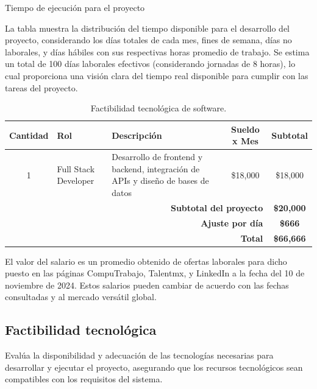 \caption{Tiempo de ejecución para el proyecto} \label{tabla:tiempo_proyecto}
\vspace{0.5cm}
\endgroup
La tabla muestra la distribución del tiempo disponible para el desarrollo del proyecto, considerando los días totales de cada mes, fines de semana, días no laborales, y días hábiles con sus respectivas horas promedio de trabajo. Se estima un total de 100 días laborales efectivos (considerando jornadas de 8 horas), lo cual proporciona una visión clara del tiempo real disponible para cumplir con las tareas del proyecto.

\begin{table}[H]
	\centering
	\begin{tabular}{|c|>{\centering\arraybackslash}m{2.5cm}|>{\centering\arraybackslash}m{3cm}|c|c|}
		\hline
		\rowcolor{black!75} \color{white} \textbf{Cantidad} & \color{white} \textbf{Rol} & \color{white} \textbf{Descripción} & \color{white} \textbf{Sueldo x Mes} & \color{white} \textbf{Subtotal} \\ 
		\hline
		1 & Full Stack Developer & Desarrollo de frontend y backend, integración de APIs y diseño de bases de datos & \$18,000 & \$18,000 \\ 
		\hline
		\multicolumn{4}{r|}{\textbf{Subtotal del proyecto}} & \textbf{\$20,000} \\ 
		\hline
		\multicolumn{4}{r|}{\textbf{Ajuste por día}} & \textbf{\$666} \\ 
		\hline
		\multicolumn{4}{r|}{\textbf{Total}} & \textbf{\$66,666} \\ 
		\hline
	\end{tabular}
	\caption{Factibilidad tecnológica de software.}
	\label{tab:costos_roles}
\end{table}



El valor del salario es un promedio obtenido de ofertas laborales para dicho puesto en las páginas CompuTrabajo, Talentmx, y LinkedIn a la fecha del 10 de noviembre de 2024. Estos salarios pueden cambiar de acuerdo con las fechas consultadas y al mercado versátil global.

\subsection{Factibilidad tecnológica}

Evalúa la disponibilidad y adecuación de las tecnologías necesarias para desarrollar y ejecutar el proyecto, asegurando que los recursos tecnológicos sean compatibles con los requisitos del sistema.

